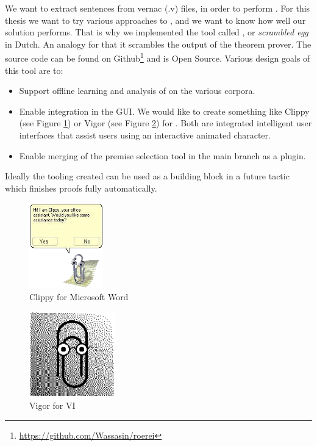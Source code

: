 We want to extract \pcic sentences from \coq vernac (.v) files, in order to perform \premiseselection.
For this thesis we want to try various approaches to \premiseselection,
and we want to know how well our solution performs.
That is why we implemented the \premiseselection tool called \roerei, or \emph{scrambled egg} in Dutch.
An analogy for that it scrambles the output of the \coq theorem prover.
The source code can be found on Github\footnote{\url{https://github.com/Wassasin/roerei}} and is Open Source.
Various design goals of this tool are to:
\begin{itemize}
    \item Support offline learning and analysis of \machinelearning on the various corpora.
    \item Enable integration in the \coqide GUI.
		We would like to create something like Clippy (see Figure \ref{figure:clippy}) or Vigor (see Figure \ref{figure:vigor}) for \coq.
		Both are integrated intelligent user interfaces that assist users using an interactive animated character.
    \item Enable merging of the premise selection tool in the \coq main branch as a plugin.
\end{itemize}
Ideally the tooling created can be used as a building block in a future \coq tactic which finishes proofs fully automatically.

\begin{center}
	\begin{minipage}{0.49\linewidth}
		\begin{figure}[H]
			\centering
			\includegraphics[height=10em]{assets/clippy.png}
			\caption{Clippy for Microsoft Word}
			\label{figure:clippy}
		\end{figure}
	\end{minipage}
	\begin{minipage}{0.49\linewidth}
		\begin{figure}[H]
			\centering
			\includegraphics[height=10em]{assets/vigor.png}
			\caption{Vigor for VI}
			\label{figure:vigor}
		\end{figure}
	\end{minipage}
\end{center}

